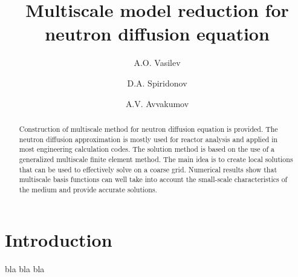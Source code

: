 \documentclass[runningheads]{llncs}
\begin{document}
%
\title{Multiscale model reduction for neutron diffusion equation}
%
%
\author{A.O. Vasilev \and 
D.A. Spiridonov \and
A.V. Avvakumov }
%
%
%
\maketitle              %
%
\begin{abstract}
Construction of multiscale method for neutron diffusion equation is provided. 
The neutron diffusion approximation is mostly used for reactor analysis and applied in most engineering calculation codes. 
The solution method is based on the use of a generalized multiscale finite element method.
The main idea is to create local solutions that can be used to effectively solve on a coarse grid.
Numerical results show that multiscale basis functions can well take into account the small-scale characteristics of the medium and provide accurate solutions. 

\end{abstract}

\section{Introduction}
bla bla bla
\end{document}
